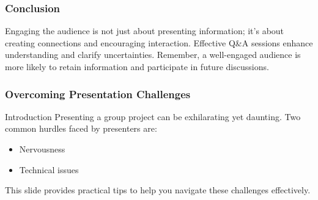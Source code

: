 \documentclass{beamer}
\begin{document}
\begin{frame}[fragile]
    \frametitle{Conclusion}
    Engaging the audience is not just about presenting information; it’s about creating connections and encouraging interaction. Effective Q\&A sessions enhance understanding and clarify uncertainties. Remember, a well-engaged audience is more likely to retain information and participate in future discussions.
\end{frame}

\begin{frame}[fragile]
    \frametitle{Overcoming Presentation Challenges}
    \begin{block}{Introduction}
        Presenting a group project can be exhilarating yet daunting. Two common hurdles faced by presenters are:
        \begin{itemize}
            \item Nervousness
            \item Technical issues
        \end{itemize}
        This slide provides practical tips to help you navigate these challenges effectively.
    \end{block}
\end{frame}
\end{document}
